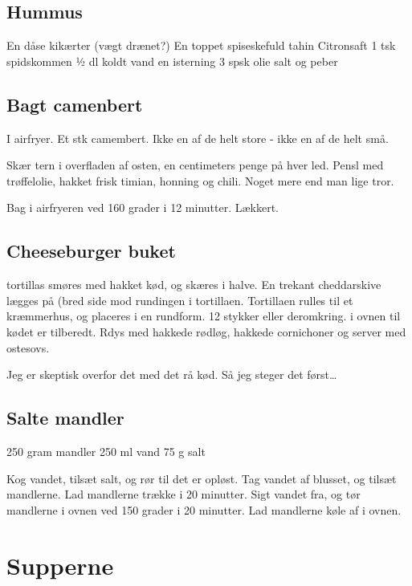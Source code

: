 \documentclass[
]{book}
\begin{document}
\section{Hummus}\label{hummus}

En dåse kikærter (vægt drænet?)
En toppet spiseskefuld tahin
Citronsaft
1 tsk spidskommen
½ dl koldt vand
en isterning
3 spsk olie
salt og peber

\section{Bagt camenbert}\label{bagt-camenbert}

I airfryer. Et stk camembert. Ikke en af de helt store - ikke en af de helt små.

Skær tern i overfladen af osten, en centimeters penge på hver led.
Pensl med trøffelolie, hakket frisk timian, honning og chili. Noget mere end man
lige tror.

Bag i airfryeren ved 160 grader i 12 minutter. Lækkert.

\section{Cheeseburger buket}\label{cheeseburger-buket}

tortillas smøres med hakket kød, og skæres i halve.
En trekant cheddarskive lægges på (bred side mod rundingen i tortillaen.
Tortillaen rulles til et kræmmerhus, og placeres i en rundform. 12 stykker eller
deromkring. i ovnen til kødet er tilberedt. Rdys med hakkede rødløg, hakkede
cornichoner og server med ostesovs.

Jeg er skeptisk overfor det med det rå kød. Så jeg steger det først\ldots{}

\section{Salte mandler}\label{salte-mandler}

250 gram mandler
250 ml vand
75 g salt

Kog vandet, tilsæt salt, og rør til det er opløst.
Tag vandet af blusset, og tilsæt mandlerne.
Lad mandlerne trække i 20 minutter.
Sigt vandet fra, og tør mandlerne i ovnen ved 150 grader i 20 minutter. Lad mandlerne køle af i ovnen.

\chapter{Supperne}\label{supperne}
\end{document}
